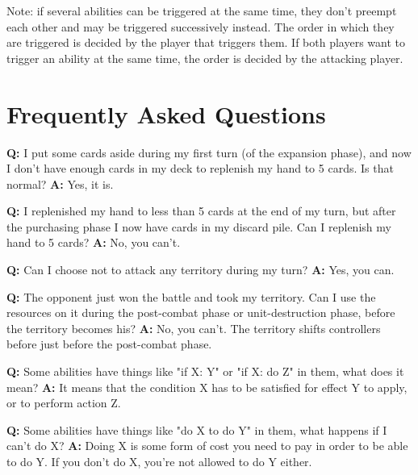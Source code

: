 \documentclass[a4paper]{article}
\begin{document}
    Note: if several abilities can be triggered at the same time,
    they don't preempt each other and may be triggered successively instead.
    The order in which they are triggered is decided by the player that triggers them.
    If both players want to trigger an ability at the same time,
    the order is decided by the attacking player.
    
    
\newpage
\section{Frequently Asked Questions}

    \hspace{-2em}
    \textbf{Q:} I put some cards aside during my first turn (of the expansion phase),
    and now I don't have enough cards in my deck to replenish my hand to 5 cards.
    Is that normal?
    \newline
    \textbf{A:} Yes, it is.

    \hspace{-2em}
    \textbf{Q:} I replenished my hand to less than 5 cards at the end of my turn,
    but after the purchasing phase I now have cards in my discard pile.
    Can I replenish my hand to 5 cards?
    \newline
    \textbf{A:} No, you can't.

    \hspace{-2em}
    \textbf{Q:} Can I choose not to attack any territory during my turn?
    \newline
    \textbf{A:} Yes, you can.

    \hspace{-2em}
    \textbf{Q:} The opponent just won the battle and took my territory.
    Can I use the resources on it during the post-combat phase
    or unit-destruction phase, before the territory becomes his?
    \newline
    \textbf{A:} No, you can't. The territory shifts controllers before just
    before the post-combat phase.

    \hspace{-2em}
    \textbf{Q:} Some abilities have things like "if X: Y" or "if X: do Z" in them,
     what does it mean?
    \newline
    \textbf{A:} It means that the condition X has to be satisfied for effect Y to apply,
    or to perform action Z.

    \hspace{-2em}
    \textbf{Q:} Some abilities have things like "do X to do Y" in them,
    what happens if I can't do X?
    \newline
    \textbf{A:} Doing X is some form of cost you need to pay in order to be able to
    do Y. If you don't do X, you're not allowed to do Y either.
\end{document}
